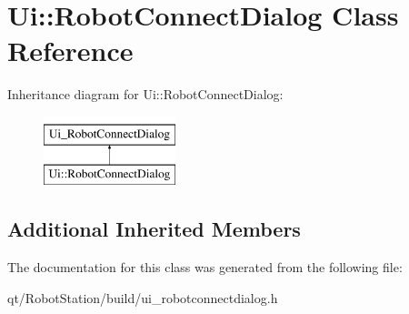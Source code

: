 \hypertarget{classUi_1_1RobotConnectDialog}{}\section{Ui\+:\+:Robot\+Connect\+Dialog Class Reference}
\label{classUi_1_1RobotConnectDialog}
Inheritance diagram for Ui\+:\+:Robot\+Connect\+Dialog\+:\begin{figure}[H]
\begin{center}
\leavevmode
\includegraphics[height=2.000000cm]{classUi_1_1RobotConnectDialog}
\end{center}
\end{figure}
\subsection*{Additional Inherited Members}


The documentation for this class was generated from the following file\+:\begin{DoxyCompactItemize}
\item 
qt/\+Robot\+Station/build/ui\+\_\+robotconnectdialog.\+h\end{DoxyCompactItemize}
